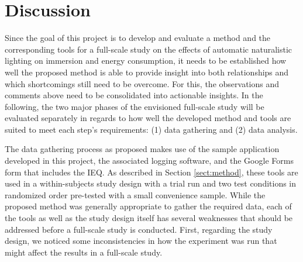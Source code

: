 \documentclass[12pt,twoside,english]{article}
\begin{document}
\section{Discussion}
\label{sect:discussion}

Since the goal of this project is to develop and evaluate a method and the corresponding tools for a full-scale study on the effects of automatic naturalistic lighting on immersion and energy consumption, it needs to be established how well the proposed method is able to provide insight into both relationships and which shortcomings still need to be overcome.
For this, the observations and comments above need to be consolidated into actionable insights.
In the following, the two major phases of the envisioned full-scale study will be evaluated separately in regards to how well the developed method and tools are suited to meet each step's requirements: (1) data gathering and (2) data analysis.

The data gathering process as proposed makes use of the sample application developed in this project, the associated logging software, and the Google Forms form that includes the \gls{IEQ}.
As described in Section \ref{sect:method}, these tools are used in a within-subjects study design with a trial run and two test conditions in randomized order pre-tested with a small convenience sample.
While the proposed method was generally appropriate to gather the required data, each of the tools as well as the study design itself has several weaknesses that should be addressed before a full-scale study is conducted.
First, regarding the study design, we noticed some inconsistencies in how the experiment was run that might affect the results in a full-scale study.
\end{document}
